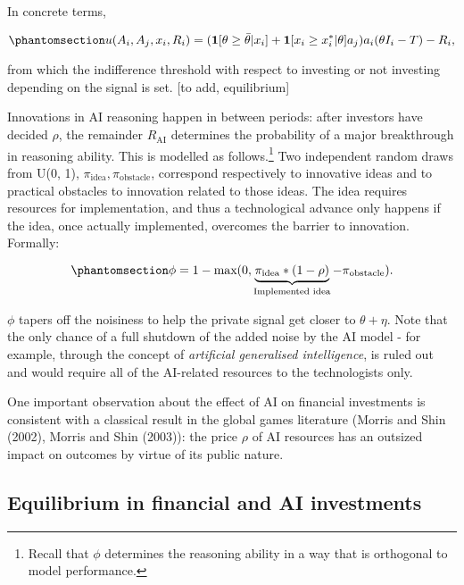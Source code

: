 \documentclass[
]{article}
\theoremstyle{plain}
\theoremstyle{remark}
\begin{document}
In concrete terms,

\begin{equation}\phantomsection\label{eq-utility}{
u(A_i, A_j, x_i, R_i) = (\mathbf{1}[\theta \geq \bar{\theta}|x_i] + \mathbf{1}[x_i \geq x_i^*|\theta]a_j)a_i(\theta I_i - T) - R_i,
}\end{equation}

from which the indifference threshold with respect to investing or not
investing depending on the signal is set. {[}to add, equilibrium{]}

Innovations in AI reasoning happen in between periods: after investors
have decided \(\rho\), the remainder \(R_{\text{AI}}\) determines the
probability of a major breakthrough in reasoning ability. This is
modelled as follows.\footnote{Recall that \(\phi\) determines the
  reasoning ability in a way that is orthogonal to model performance.}
Two independent random draws from U(0, 1),
\(\pi_{\text{idea}}, \pi_{\text{obstacle}}\), correspond respectively to
innovative ideas and to practical obstacles to innovation related to
those ideas. The idea requires resources for implementation, and thus a
technological advance only happens if the idea, once actually
implemented, overcomes the barrier to innovation. Formally:

\begin{equation}\phantomsection\label{eq-tech}{
\phi = 1-\text{max}(0, \underbrace{\pi_{\text{idea}} * (1-\rho)}_{\text{Implemented idea}} - \pi_{\text{obstacle}}).
}\end{equation}

\(\phi\) tapers off the noisiness to help the private signal get closer
to \(\theta + \eta\). Note that the only chance of a full shutdown of
the added noise by the AI model - for example, through the concept of
\emph{artificial generalised intelligence}, is ruled out and would
require all of the AI-related resources to the technologists only.

One important observation about the effect of AI on financial
investments is consistent with a classical result in the global games
literature (Morris and Shin (2002), Morris and Shin (2003)): the price
\(\rho\) of AI resources has an outsized impact on outcomes by virtue of
its public nature.

\subsection{Equilibrium in financial and AI
investments}\label{equilibrium-in-financial-and-ai-investments}
\end{document}
